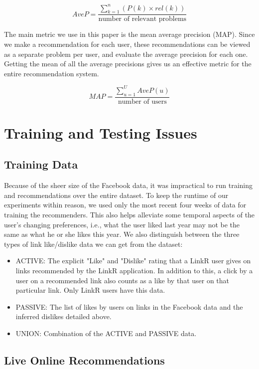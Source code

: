 \[
AveP = \frac{\sum_{k=1}^n(P(k) \times rel(k))}{\text{number of relevant problems}}
\]

The main metric we use in this paper is the mean average precision (MAP). Since we make a recommendation for each user, these recommendations can be viewed as a separate problem per user, and evaluate the average precision for each one. Getting the mean of all the average precisions gives us an effective metric for the entire recommendation system.

\[
MAP = \frac{\sum_{u=1}^U AveP(u)}{\text{number of users}}
\]

\section{Training and Testing Issues}

\subsection{Training Data}

Because of the sheer size of the Facebook data, it was impractical to run training and recommendations over the entire dataset. To keep the runtime of our experiments within reason, we used only the most recent four weeks of data for training the recommenders. This also helps alleviate some temporal aspects of the user's changing preferences, i.e., what the user liked last year may not be the same as what he or she likes this year. We also distinguish between the three types of link like/dislike data we can get from the dataset:

\begin{itemize}
\item {ACTIVE: The explicit "Like" and "Dislike" rating that a LinkR user gives on links recommended by the LinkR application. In addition to this, a click by a user on a recommended link also counts as a like by that user on that particular link. Only LinkR users have this data.}
\item {PASSIVE: The list of likes by users on links in the Facebook data and the inferred dislikes detailed above. }
\item{UNION: Combination of the ACTIVE and PASSIVE data.}
\end{itemize}

\subsection{Live Online Recommendations}

